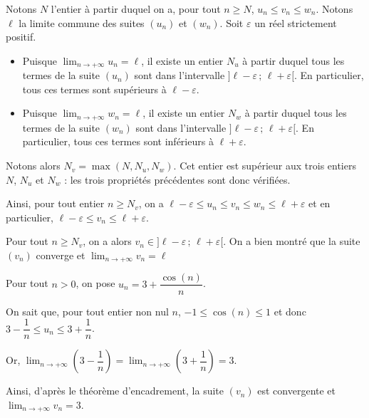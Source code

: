 \documentclass[11pt,fleqn, openany]{book} %
\begin{document}
\begin{demonstration} Notons $N$ l'entier à partir duquel on a, pour tout $n\geqslant N$, $u_n \leqslant v_n \leqslant w_n$. Notons $\ell$ la limite commune des suites $(u_n)$ et $(w_n)$. Soit $\varepsilon$ un réel strictement positif.
\begin{itemize}
\item Puisque $\displaystyle \lim_{n \to +\infty} u_n=\ell$, il existe un entier $N_u$ à partir duquel tous les termes de la suite $(u_n)$ sont dans l'intervalle $]\ell-\varepsilon\, ; \, \ell +\varepsilon [$. En particulier, tous ces termes sont supérieurs à $\ell-\varepsilon$.
\item Puisque $\displaystyle \lim_{n \to +\infty} w_n=\ell$, il existe un entier $N_w$ à partir duquel tous les termes de la suite $(w_n)$ sont dans l'intervalle $]\ell-\varepsilon\, ; \, \ell +\varepsilon [$. En particulier, tous ces termes sont inférieurs à $\ell+\varepsilon$.

\end{itemize}

Notons alors $N_v=\max(N,N_u, N_w)$. Cet entier est supérieur aux trois entiers $N$, $N_u$ et $N_w$ : les trois propriétés précédentes sont donc vérifiées.

Ainsi, pour tout entier $n\geqslant N_v$, on a $\ell-\varepsilon \leqslant u_n \leqslant v_n \leqslant w_n \leqslant \ell+\varepsilon$ et en particulier,  $\ell-\varepsilon\leqslant v_n \leqslant \ell+\varepsilon$.

Pour tout $n \geqslant N_v$, on a alors $v_n \in ]\ell-\varepsilon\, ; \, \ell +\varepsilon [$. On a bien montré que la suite $(v_n)$ converge et $\displaystyle \lim_{n \to +\infty} v_n = \ell$\end{demonstration}

\begin{example} Pour tout $n>0$, on pose $u_n=3+\dfrac{\cos (n)}{n}$.

On sait que, pour tout entier non nul $n$, $-1 \leqslant \cos (n) \leqslant 1$ et donc $ 3-\dfrac{1}{n} \leqslant u_n \leqslant 3+\dfrac{1}{n}$.

Or, $\displaystyle \lim_{n \to +\infty} \left( 3 - \dfrac{1}{n} \right) = \displaystyle \lim_{n \to +\infty} \left( 3 + \dfrac{1}{n} \right) = 3$. 

Ainsi, d'après le théorème d'encadrement, la suite $(v_n)$ est convergente et $\displaystyle \lim_{n \to +\infty} v_n = 3$.\end{example}
\end{document}
